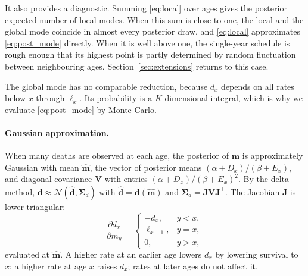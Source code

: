 \documentclass[12pt, letterpaper]{article}
\begin{document}
It also provides a diagnostic. Summing \eqref{eq:local} over ages gives the posterior expected number of local modes. When this sum is close to one, the local and the global mode coincide in almost every posterior draw, and \eqref{eq:local} approximates \eqref{eq:post_mode} directly. When it is well above one, the single-year schedule is rough enough that its highest point is partly determined by random fluctuation between neighbouring ages. Section~\ref{sec:extensions} returns to this case.

The global mode has no comparable reduction, because $d_x$ depends on all rates below $x$ through $\ell_x$. Its probability is a $K$-dimensional integral, which is why we evaluate \eqref{eq:post_mode} by Monte Carlo.

\paragraph{Gaussian approximation.} When many deaths are observed at each age, the posterior of $\bm{m}$ is approximately Gaussian with mean $\hat{\bm{m}}$, the vector of posterior means $(\alpha + D_x)/(\beta + E_x)$, and diagonal covariance $\bm{V}$ with entries $(\alpha + D_x)/(\beta + E_x)^2$. By the delta method, $\bm{d} \approx \mathcal{N}(\hat{\bm{d}}, \bm{\Sigma}_d)$ with $\hat{\bm{d}} = \bm{d}(\hat{\bm{m}})$ and $\bm{\Sigma}_d = \bm{J} \bm{V} \bm{J}^\top$. The Jacobian $\bm{J}$ is lower triangular:
\begin{equation}
\frac{\partial d_x}{\partial m_y} =
\begin{cases}
-d_x, & y < x,\\
\ell_{x+1}, & y = x,\\
0, & y > x,
\end{cases}
\label{eq:jacobian}
\end{equation}
evaluated at $\hat{\bm{m}}$. A higher rate at an earlier age lowers $d_x$ by lowering survival to $x$; a higher rate at age $x$ raises $d_x$; rates at later ages do not affect it.
\end{document}
